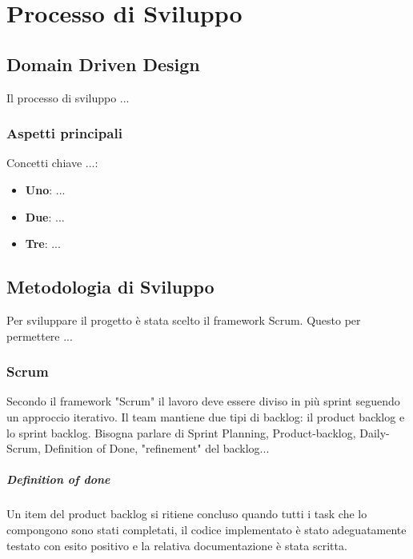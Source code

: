 \chapter{Processo di Sviluppo}

\section{Domain Driven Design}
Il processo di sviluppo ...
    \subsection{Aspetti principali}

    
    Concetti chiave ...:
    
        \begin{itemize}
        \item \textbf{Uno}: ...
        \item \textbf{Due}: ...
        \item \textbf{Tre}: ...
       
        
    \end{itemize}

 

\section{Metodologia di Sviluppo}
Per sviluppare il progetto è stata scelto il framework Scrum. Questo per permettere ... 
    \subsection{Scrum}
    Secondo il framework "Scrum" il lavoro deve essere diviso in più sprint seguendo un approccio iterativo. 
    Il team mantiene due tipi di backlog: il product backlog e lo sprint backlog. 
    Bisogna parlare di Sprint Planning, Product-backlog, Daily-Scrum, Definition of Done, "refinement" del backlog... 

    \paragraph{Definition of done} Un item del product backlog si ritiene concluso quando tutti i task che lo compongono sono stati completati, il codice implementato è stato adeguatamente testato con esito positivo e la relativa documentazione è stata scritta.
    
